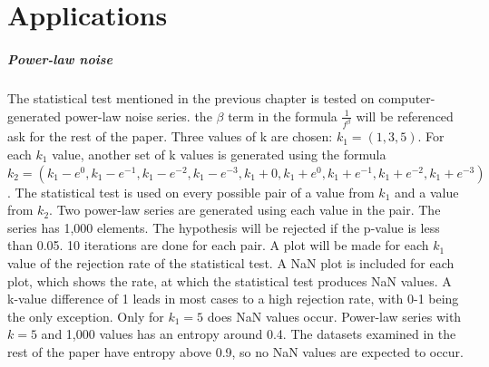\chapter{Applications}
\paragraph{Power-law noise}
The statistical test mentioned in the previous chapter is tested on computer-generated power-law noise series.\cite{Timmer1995} the $\beta$ term in the formula $\frac{1}{f^{\beta}}$ will be referenced ask for the rest of the paper. Three values of k are chosen: $k_1=(1,3,5)$. For each $k_1$ value, another set of k values is generated using the formula $k_2=(k_1-e^0,k_1-e^{-1},k_1-e^{-2},k_1-e^{-3},k_1+0,k_1+e^0,k_1+e^{-1},k_1+e^{-2},k_1+e^{-3})$. The statistical test is used on every possible pair of a value from $k_1$ and a value from $k_2$. Two power-law series are generated using each value in the pair. The series has 1,000 elements. The hypothesis will be rejected if the p-value is less than 0.05. 10 iterations are done for each pair. A plot will be made for each $k_1$ value of the rejection rate of the statistical test. A NaN plot is included for each plot, which shows the rate, at which the statistical test produces NaN values. A k-value difference of 1 leads in most cases to a high rejection rate, with 0-1 being the only exception. Only for $k_1=5$ does NaN values occur. Power-law series with $k=5$ and 1,000 values has an entropy around 0.4. The datasets examined in the rest of the paper have entropy above 0.9, so no NaN values are expected to occur.


